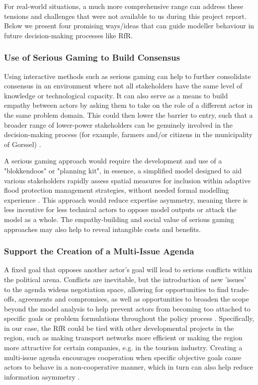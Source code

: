 For real-world situations, a much more comprehensive range can address these tensions and challenges that were not available to us during this project report. Below we present four promising ways/ideas that can guide modeller behaviour in future decision-making processes like RfR.

\subsubsection{Use of Serious Gaming to Build Consensus}

Using interactive methods such as serious gaming can help to further consolidate consensus in an environment where not all stakeholders have the same level of knowledge or technological capacity. It can also serve as a means to build empathy between actors by asking them to take on the role of a different actor in the same problem domain. This could then lower the barrier to entry, such that a broader range of lower-power stakeholders can be genuinely involved in the decision-making process (for example, farmers and/or citizens in the municipality of Gorssel) \parencite{savic_serious_2016}.

A serious gaming approach would require the development and use of a "blokkendoos" or "planning kit", in essence, a simplified model designed to aid various stakeholders rapidly assess spatial measures for inclusion within adaptive flood protection management strategies, without needed formal modelling experience \parencite{warren_collaborative_2015}. This approach would reduce expertise asymmetry, meaning there is less incentive for less technical actors to oppose model outputs or attack the model as a whole. The empathy-building and social value of serious gaming approaches may also help to reveal intangible costs and benefits. 

\subsubsection{Support the Creation of a Multi-Issue Agenda} 

A fixed goal that opposes another actor's goal will lead to serious conflicts within the political arena. Conflicts are inevitable, but the introduction of new 'issues' to the agenda widens negotiation space, allowing for opportunities to find trade-offs, agreements and compromises, as well as opportunities to broaden the scope beyond the model analysis to help prevent actors from becoming too attached to specific goals or problem formulations throughout the policy process \parencite{hans_de_bruijn_mark_de_bruijne_ernst_ten_heuvelhof_politics_2015}. Specifically, in our case, the RfR could be tied with other developmental projects in the region, such as making transport networks more efficient or making the region more attractive for certain companies, e.g. in the tourism industry. Creating a multi-issue agenda encourages cooperation when specific objective goals cause actors to behave in a non-cooperative manner, which in turn can also help reduce information asymmetry \parencite{coehoorn_learning_2004}.

